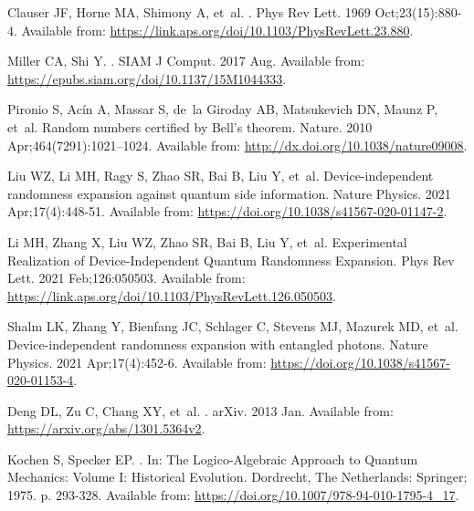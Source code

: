 \documentclass[]{interact}
\theoremstyle{plain}%
\theoremstyle{definition}
\theoremstyle{remark}
\begin{document}
\begin{thebibliography}{100}
Clauser JF, Horne MA, Shimony A, et~al.
.
\newblock Phys Rev Lett. 1969 Oct;23(15):880-4.
\newblock Available from:
  \url{https://link.aps.org/doi/10.1103/PhysRevLett.23.880}.

Miller CA, Shi Y.
.
\newblock SIAM J Comput. 2017 Aug.
\newblock Available from: \url{https://epubs.siam.org/doi/10.1137/15M1044333}.

Pironio S, Acín A, Massar S, de~la Giroday AB, Matsukevich DN, Maunz P, et~al.
\newblock Random numbers certified by Bell’s theorem.
\newblock Nature. 2010 Apr;464(7291):1021–1024.
\newblock Available from: \url{http://dx.doi.org/10.1038/nature09008}.

Liu WZ, Li MH, Ragy S, Zhao SR, Bai B, Liu Y, et~al.
\newblock Device-independent randomness expansion against quantum side
  information.
\newblock Nature Physics. 2021 Apr;17(4):448-51.
\newblock Available from: \url{https://doi.org/10.1038/s41567-020-01147-2}.

Li MH, Zhang X, Liu WZ, Zhao SR, Bai B, Liu Y, et~al.
\newblock Experimental Realization of Device-Independent Quantum Randomness
  Expansion.
\newblock Phys Rev Lett. 2021 Feb;126:050503.
\newblock Available from:
  \url{https://link.aps.org/doi/10.1103/PhysRevLett.126.050503}.

Shalm LK, Zhang Y, Bienfang JC, Schlager C, Stevens MJ, Mazurek MD, et~al.
\newblock Device-independent randomness expansion with entangled photons.
\newblock Nature Physics. 2021 Apr;17(4):452-6.
\newblock Available from: \url{https://doi.org/10.1038/s41567-020-01153-4}.

Deng DL, Zu C, Chang XY, et~al.
.
\newblock arXiv. 2013 Jan.
\newblock Available from: \url{https://arxiv.org/abs/1301.5364v2}.

Kochen S, Specker EP.
.
\newblock In: {The Logico-Algebraic Approach to Quantum Mechanics: Volume I:
  Historical Evolution}. Dordrecht, The Netherlands: Springer; 1975. p.
  293-328.
\newblock Available from: \url{https://doi.org/10.1007/978-94-010-1795-4_17}.


\end{thebibliography}
\end{document}
